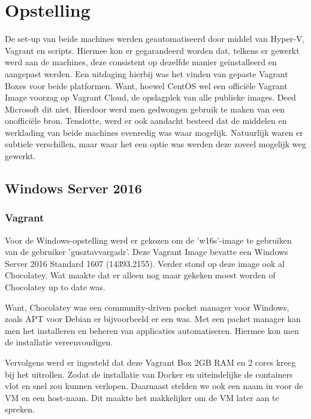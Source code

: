 
\chapter{Opstelling}
\label{ch:opstelling}

De set-up van beide machines werden geautomatiseerd door middel van Hyper-V, Vagrant en scripts. Hiermee kon er gegarandeerd worden dat, telkens er gewerkt werd aan de machines, deze consistent op dezelfde manier geïnstalleerd en aangepast werden.
Een uitdaging hierbij was het vinden van gepaste Vagrant Boxes voor beide platformen. Want, hoewel CentOS wel een officiële Vagrant Image voorzag op Vagrant Cloud, de opslagplek van alle publieke images. Deed Microsoft dit niet. Hierdoor werd men gedwongen gebruik te maken van een onofficiële bron.
Tenslotte, werd er ook aandacht besteed dat de middelen en werklading van beide machines evenredig was waar mogelijk. Natuurlijk waren er subtiele verschillen, maar waar het een optie was werden deze zoveel mogelijk weg gewerkt.

\section{Windows Server 2016}


\subsection{Vagrant}
Voor de Windows-opstelling werd er gekozen om de 'w16s'-image te gebruiken van de gebruiker 'gusztavvargadr'. Deze Vagrant Image bevatte een Windows Server 2016 Standard 1607 (14393.2155). Verder stond op deze image ook al Chocolatey. Wat maakte dat er alleen nog maar gekeken moest worden of Chocolatey up to date was.

Want, Chocolatey was een community-driven packet manager voor Windows, zoals APT voor Debian er bijvoorbeeld er een was. Met een packet manager kan men het installeren en beheren van applicaties automatiseren. Hiermee kon men de installatie vereenvoudigen.

Vervolgens werd er ingesteld dat deze Vagrant Box 2GB RAM en 2 cores kreeg bij het uitrollen. Zodat de installatie van Docker en uiteindelijke de containers vlot en snel zou kunnen verlopen. Daarnaast stelden we ook een naam in voor de VM en een host-naam. Dit maakte het makkelijker om de VM later aan te spreken.

